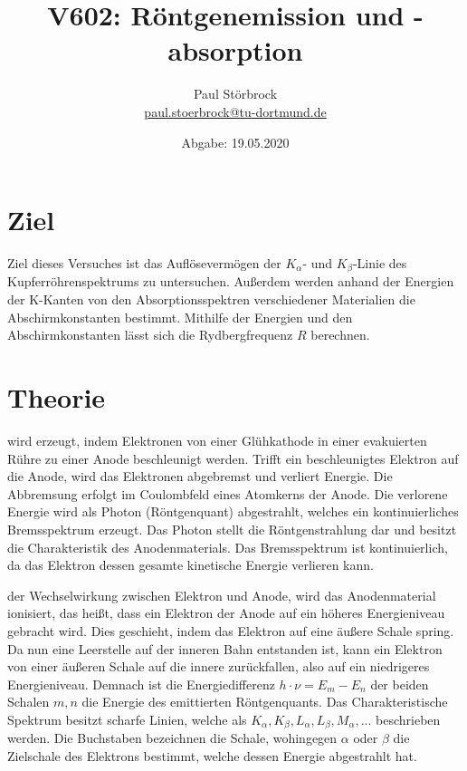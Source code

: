 
\usepackage{tikz}

\newcommand*\circled[1]{\tikz[baseline=(char.base)]{
            \node[shape=circle,draw,inner sep=2pt] (char) {#1};}}


    \title{V602: Röntgenemission und -absorption}
    \author{  
    Paul Störbrock\\
    \texorpdfstring{\href{mailto:paul.stoerbrock@tu-dortmund.de}{paul.stoerbrock@tu-dortmund.de}}{}
    }
    \date{Abgabe: 19.05.2020\vspace{-4ex}}
\maketitle
    
\newpage
\tableofcontents
\newpage

\setcounter{page}{1}

\section{Ziel}

\justifying Ziel dieses Versuches ist das Auflösevermögen der $K_{\alpha}$- und $K_{\beta}$-Linie des Kupferröhrenspektrums
zu untersuchen. Außerdem werden anhand der Energien der K-Kanten von den Absorptionsspektren verschiedener Materialien die Abschirmkonstanten bestimmt. 
Mithilfe der Energien und den Abschirmkonstanten lässt sich die Rydbergfrequenz $R$ berechnen. 

\section{Theorie}

\justifying wird erzeugt, indem Elektronen von einer Glühkathode in einer evakuierten Rühre zu einer
Anode beschleunigt werden. Trifft ein beschleunigtes Elektron auf die Anode, wird das Elektronen abgebremst und verliert Energie. Die Abbremsung
erfolgt im Coulombfeld eines Atomkerns der Anode. Die verlorene Energie wird als Photon (Röntgenquant) abgestrahlt, welches ein kontinuierliches 
Bremsspektrum erzeugt. Das Photon stellt die Röntgenstrahlung dar und besitzt die Charakteristik des Anodenmaterials. Das Bremsspektrum ist 
kontinuierlich, da das Elektron dessen gesamte kinetische Energie verlieren kann. 

\justifying der Wechselwirkung zwischen Elektron und Anode, wird das Anodenmaterial ionisiert, das heißt, dass ein Elektron der
Anode auf ein höheres Energieniveau gebracht wird. Dies geschieht, indem das Elektron auf eine äußere Schale spring. Da nun eine Leerstelle auf der
inneren Bahn entstanden ist, kann ein Elektron von einer äußeren Schale auf die innere zurückfallen, also auf ein niedrigeres Energieniveau.
Demnach ist die Energiedifferenz $h\cdot\nu=E_m - E_n$ \cite{V602} der beiden Schalen $m,n$ die Energie des emittierten Röntgenquants. 
Das Charakteristische Spektrum besitzt scharfe Linien, welche als $K_{\alpha}, K_{\beta}, L_{\alpha}, L_{\beta}, M_{\alpha},...$ beschrieben werden. 
Die Buchstaben bezeichnen die Schale, wohingegen $\alpha$ oder $\beta$ die Zielschale des Elektrons bestimmt, welche dessen Energie abgestrahlt 
hat. 

